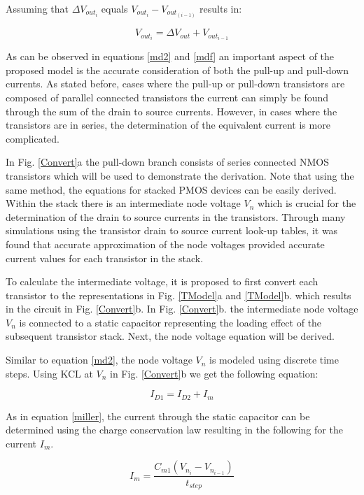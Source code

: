 Assuming that $\Delta V_{out_i}$ equals $V_{out_i} - V_{out_{(i-1)}}$ results in:

\begin{equation} \label{mdf}
V_{out_i} = \Delta V_{out} + V_{out_{i-1}}
\end{equation}

As can be observed in equations \ref{md2} and \ref{mdf} an important aspect of the proposed model is the accurate consideration of both the pull-up and pull-down currents. As stated before, cases where the pull-up or pull-down transistors are composed of parallel connected transistors the current can simply be found through the sum of the drain to source currents. However, in cases where the transistors are in series, the determination of the equivalent current is more complicated.

In Fig. \ref{Convert}a the pull-down branch consists of series connected NMOS transistors which will be used to demonstrate the derivation. Note that using the same method, the equations for stacked PMOS devices can be easily derived. Within the stack there is an intermediate node voltage $V_n$ which is crucial for the determination of the drain to source currents in the transistors. Through many simulations using the transistor drain to source current look-up tables, it was found that accurate approximation of the node voltages provided accurate current values for each transistor in the stack. 

To calculate the intermediate voltage, it is proposed to first convert each transistor to the representations in Fig. \ref{TModel}a and \ref{TModel}b. which results in the circuit in Fig. \ref{Convert}b. In Fig. \ref{Convert}b. the intermediate node voltage $V_n$ is connected to a static capacitor representing the loading effect of the subsequent transistor stack. Next, the node voltage equation will be derived.

Similar to equation \ref{md2}, the node voltage $V_n$ is modeled using discrete time steps. Using KCL at $V_n$ in Fig. \ref{Convert}b we get the following equation:

\begin{equation} \label{KCLNode}
I_{D1} = I_{D2} + I_m
\end{equation}

As in equation \ref{miller}, the current through the static capacitor can be determined using the charge conservation law resulting in the following for the current $I_m$.

\begin{equation} \label{millernode}
I_m = \frac{C_{m1}(V_{n_i} - V_{n_{i-1}})}{t_{step}}
\end{equation}

